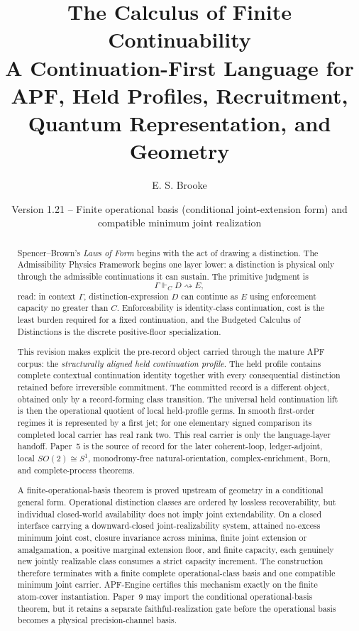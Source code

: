 \documentclass[11pt]{article}
\title{The Calculus of Finite Continuability\\
\large A Continuation-First Language for APF, Held Profiles, Recruitment, Quantum Representation, and Geometry}
\author{E. S. Brooke}
\date{Version 1.21 -- Finite operational basis (conditional joint-extension form) and compatible minimum joint realization}
\theoremstyle{remark}
\newcommand{\G}{\Gamma}
\newcommand{\entails}{\Vdash}
\newcommand{\goes}{\rightsquigarrow}
\begin{document}
\maketitle

\begin{abstract}
Spencer--Brown's \emph{Laws of Form} begins with the act of drawing a distinction.  The Admissibility Physics Framework begins one layer lower: a distinction is physical only through the admissible continuations it can sustain.  The primitive judgment is
\[
        \G\entails_C D\goes E,
\]
read: in context \(\G\), distinction-expression \(D\) can continue as \(E\) using enforcement capacity no greater than \(C\).  Enforceability is identity-class continuation, cost is the least burden required for a fixed continuation, and the Budgeted Calculus of Distinctions is the discrete positive-floor specialization.

This revision makes explicit the pre-record object carried through the mature APF corpus: the \emph{structurally aligned held continuation profile}.  The held profile contains complete contextual continuation identity together with every consequential distinction retained before irreversible commitment.  The committed record is a different object, obtained only by a record-forming class transition.  The universal held continuation lift is then the operational quotient of local held-profile germs.  In smooth first-order regimes it is represented by a first jet; for one elementary signed comparison its completed local carrier has real rank two.  This real carrier is only the language-layer handoff.  Paper~5 is the source of record for the later coherent-loop, ledger-adjoint, local \(SO(2)\cong S^1\), monodromy-free natural-orientation, complex-enrichment, Born, and complete-process theorems.

A finite-operational-basis theorem is proved upstream of geometry in a conditional general form.  Operational distinction classes are ordered by lossless recoverability, but individual closed-world availability does not imply joint extendability.  On a closed interface carrying a downward-closed joint-realizability system, attained no-excess minimum joint cost, closure invariance across minima, finite joint extension or amalgamation, a positive marginal extension floor, and finite capacity, each genuinely new jointly realizable class consumes a strict capacity increment.  The construction therefore terminates with a finite complete operational-class basis and one compatible minimum joint carrier.  APF-Engine certifies this mechanism exactly on the finite atom-cover instantiation.  Paper~9 may import the conditional operational-basis theorem, but it retains a separate faithful-realization gate before the operational basis becomes a physical precision-channel basis.


\end{abstract}
\end{document}

